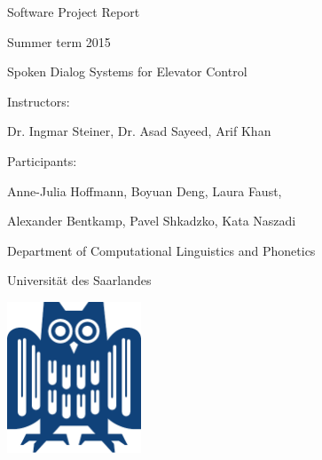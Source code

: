 
\begin{center} Software Project Report \end{center}
\begin{center} Summer term 2015 \end{center}
\hspace{1cm}
\begin{center}\Large{Spoken Dialog Systems for Elevator Control} \end{center}
\hspace{1cm}

\begin{center}Instructors:\end{center}
\begin{center}
Dr. Ingmar Steiner, Dr. Asad Sayeed, Arif Khan 
\end{center}

\vfill

\begin{center} Participants: \end{center}
\begin{center}
Anne-Julia Hoffmann, Boyuan Deng, Laura Faust, 
\end{center}
\begin{center}
Alexander Bentkamp, Pavel Shkadzko, Kata Naszadi
\end{center}

\vfill
\vfill

\begin{center} Department of Computational Linguistics and Phonetics \end{center}
\begin{center} Universität des Saarlandes \end{center}
\vfill
\begin{center}
  \includegraphics[width=4.0cm]{logo_uds.pdf}
\end{center}
\vfill
\vfill
